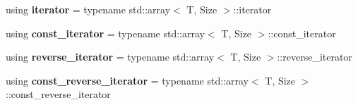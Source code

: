 \begin{DoxyCompactItemize}
using {\bfseries iterator} = typename std\+::array$<$ T, Size $>$\+::iterator
\item 
\mbox{\label{classnumpp_1_1vector_aeb72fcde951bfd845ba24d9f01ec9d14}} 
using {\bfseries const\+\_\+iterator} = typename std\+::array$<$ T, Size $>$\+::const\+\_\+iterator
\item 
\mbox{\label{classnumpp_1_1vector_ab3bb945307c72ee6f5e2b45097a2ed6d}} 
using {\bfseries reverse\+\_\+iterator} = typename std\+::array$<$ T, Size $>$\+::reverse\+\_\+iterator
\item 
\mbox{\label{classnumpp_1_1vector_a761280bdf7e645f5fe7b7c44cf12fc65}} 
using {\bfseries const\+\_\+reverse\+\_\+iterator} = typename std\+::array$<$ T, Size $>$\+::const\+\_\+reverse\+\_\+iterator
\end{DoxyCompactItemize}
